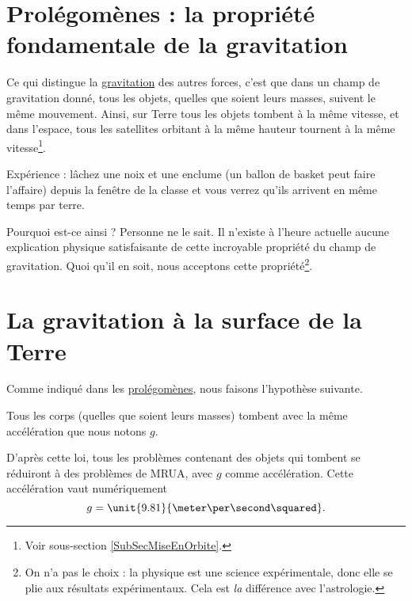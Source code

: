 

\section[Prolégomènes]{Prolégomènes : la propriété fondamentale de la gravitation}

Ce qui distingue la \href{http://fr.wikipedia.org/wiki/Gravitation}{gravitation} des autres forces, c'est que dans un champ de gravitation donné, tous les objets, quelles que soient leurs masses, suivent le même mouvement. Ainsi, sur Terre tous les objets tombent à la même vitesse, et dans l'espace, tous les satellites orbitant à la même hauteur tournent à la même vitesse\footnote{Voir sous-section \ref{SubSecMiseEnOrbite}.}.

Expérience : lâchez une noix et une enclume (un ballon de basket peut faire l'affaire) depuis la fenêtre de la classe et vous verrez qu'ils arrivent en même temps par terre.

Pourquoi est-ce ainsi ? Personne ne le sait. Il n'existe à l'heure actuelle aucune explication physique satisfaisante de cette incroyable propriété du champ de gravitation. Quoi qu'il en soit, nous acceptons cette propriété\footnote{On n'a pas le choix : la physique est une science expérimentale, donc elle se plie aux résultats expérimentaux. Cela est \emph{la} différence avec l'astrologie.}.

\section{La gravitation à la surface de la Terre}

Comme indiqué dans les \href{http://fr.wiktionary.org/wiki/prolégomènes}{prolégomènes}, nous faisons l'hypothèse suivante.
\setcounter{numloiphyz}{0}		%
\begin{loiphyz}
	Tous les corps (quelles que soient leurs masses) tombent avec la même accélération que nous notons $g$.
\end{loiphyz}
D'après cette loi, tous les problèmes contenant des objets qui tombent se réduiront à des problèmes de MRUA, avec $g$ comme accélération. Cette accélération vaut numériquement
\begin{equation}
	g=\unit{9.81}{\meter\per\second\squared}.
\end{equation}

